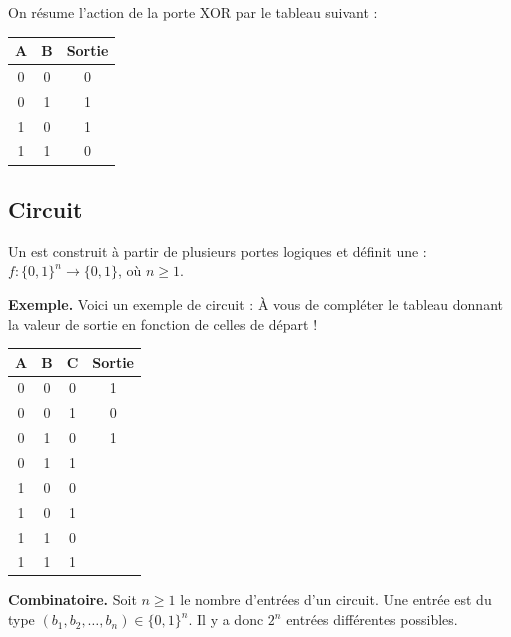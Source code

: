 \documentclass[11pt,class=report,crop=false]{standalone}
\begin{document}
On résume l'action de la porte XOR par le tableau suivant :

\begin{center}
\begin{minipage}{0.45\textwidth}
\begin{center}
\begin{tabular}{|c|c|c|}
\hline
A & B & Sortie \\ \hline\hline
0 & 0 & 0 \\
0 & 1 & 1 \\
1 & 0 & 1 \\
1 & 1 & 0 \\ \hline
\end{tabular}
\end{center}
\end{minipage}
\begin{minipage}{0.45\textwidth}
\end{minipage}
\end{center}

\subsection{Circuit}


Un  est construit à partir de plusieurs portes logiques et définit une  :
$f : \{0,1\}^n \to \{0,1\}$, où $n\ge1$.

\textbf{Exemple.}
Voici un exemple de circuit :
À vous de compléter le tableau donnant la valeur de sortie en fonction de celles de départ !
\begin{center}
\begin{tabular}{|c|c|c|c|}
\hline
A & B & C & Sortie \\ \hline\hline
0 & 0 & 0 & 1 \\
0 & 0 & 1 & 0 \\
0 & 1 & 0 & 1 \\
0 & 1 & 1 &  \\
1 & 0 & 0 &  \\
1 & 0 & 1 &  \\
1 & 1 & 0 &  \\
1 & 1 & 1 &  \\ \hline
\end{tabular}
\end{center}


\textbf{Combinatoire.}
Soit $n\ge1$ le nombre d'entrées d'un circuit.
Une entrée est du type $(b_1,b_2,\ldots,b_n) \in \{0,1\}^n$. 
Il y a donc $2^n$ entrées différentes possibles.
\end{document}
